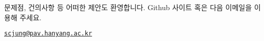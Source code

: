 \begin{center}
\end{center}

문제점, 건의사항 등 어떠한 제안도 환영합니다. \textsf{Github} 사이트 혹은 다음
이메일을 이용해 주세요.

\begin{center}
\href{mailto:scjung@pav.hanyang.ac.kr}{\texttt{scjung@pav.hanyang.ac.kr}}
\end{center}


